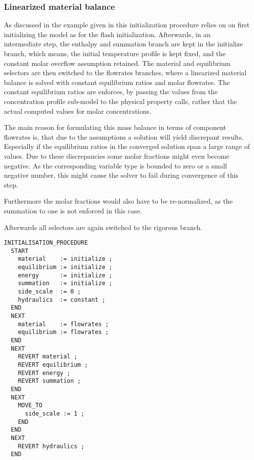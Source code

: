     \subsubsection{Linearized material balance}
        As discussed in the example given in  this initialization
        procedure relies on on first initializing the model as for the flash initialization. Afterwards,
        in an intermediate step, the enthalpy and summation branch are kept in the initialize branch,
        which means, the initial temperature profile is kept fixed, and the constant molar overflow assumption
        retained. The material and equilibrium selectors are then switched to the flowrates branches, where
        a linearized material balance is solved with constant equilibrium ratios and molar flowrates.
        The constant equilibrium ratios are enforces, by passing the values from the concentration profile
        sub-model to the physical property calls, rather that the actual computed values for molar
        concentrations.

        The main reason for formulating this mass balance in terms of component flowrates is, that due to
        the assumptions a solution will yield discrepant results. Especially if the equilibrium ratios
        in the converged solution span a large range of values. Due to these discrepancies some
        molar fractions might even become negative. As the corresponding variable type is bounded to zero
        or a small negative number, this might cause the solver to fail during convergence of this step.

        Furthermore the molar fractions would also have to be re-normalized, as the summation to one
        is not enforced in this case.

        Afterwards all selectors are again switched to the rigorous branch.

\begin{lstlisting}
INITIALISATION_PROCEDURE
  START
    material    := initialize ;
    equilibrium := initialize ;
    energy      := initialize ;
    summation   := initialize ;
    side_scale  := 0 ;
    hydraulics  := constant ;
  END
  NEXT
    material    := flowrates ;
    equilibrium := flowrates ;
  END
  NEXT
    REVERT material ;
    REVERT equilibrium ;
    REVERT energy ;
    REVERT summation ;
  END
  NEXT 
    MOVE_TO
      side_scale := 1 ;
    END
  END
  NEXT 
    REVERT hydraulics ;
  END
\end{lstlisting}



